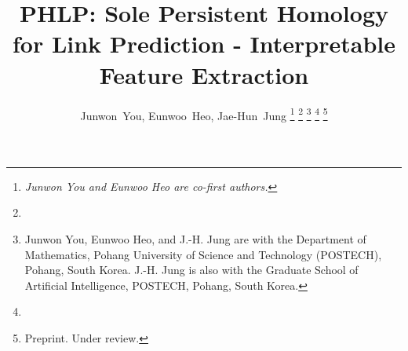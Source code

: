 \documentclass[lettersize,journal,twoside]{IEEEtran}
\begin{document}
\title{PHLP: Sole Persistent Homology for Link Prediction - Interpretable Feature Extraction}

\author{
Junwon~You, 
Eunwoo~Heo,
Jae-Hun~Jung
\thanks{\textit{Junwon You and Eunwoo Heo are co-first authors.}}
\thanks{}
\thanks{Junwon You, Eunwoo Heo, and J.-H. Jung are with the Department of Mathematics, Pohang University of Science and Technology (POSTECH), Pohang, South Korea. 
J.-H. Jung is also with the Graduate School of Artificial Intelligence, POSTECH, Pohang, South Korea.}
\thanks{}
\thanks{Preprint. Under review.}}

\maketitle











\end{document}
